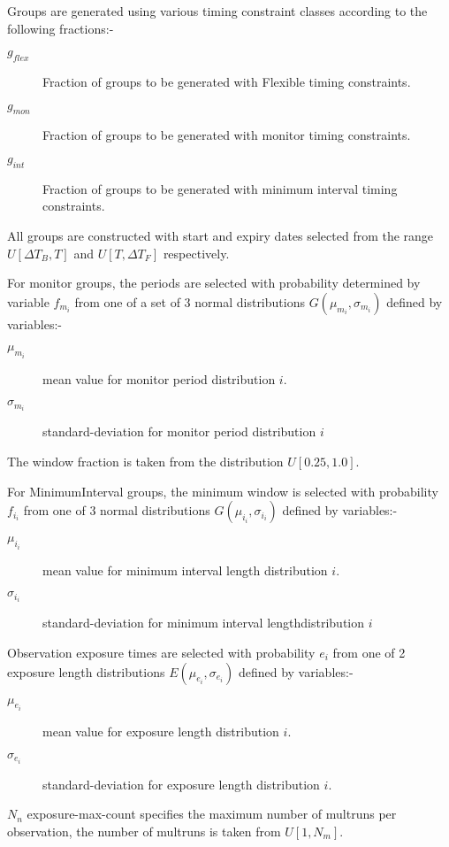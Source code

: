 Groups are generated using various timing constraint classes according to the following fractions:-
\begin{description}
\item [$g_{flex}$] Fraction of groups to be generated with Flexible timing constraints.
\item [$g_{mon}$]  Fraction of groups to be generated with monitor timing constraints.
\item [$g_{int}$]  Fraction of groups to be generated with minimum interval timing constraints.
\end{description}

All groups are constructed with start and expiry dates selected from the range $U[\Delta{T_B}, T]$ and $U[T, \Delta{T_F}]$ respectively. 

For monitor groups, the periods are selected with probability determined by variable $f_{m_i}$ from one of a set of 3 normal distributions $G(\mu_{m_i}, \sigma_{m_i})$ defined by variables:-

\begin{description}
\item [$\mu_{m_i}$]     mean value for monitor period distribution $i$.
\item [$\sigma_{m_i}$]  standard-deviation for monitor period distribution $i$
\end{description}
The window fraction is taken from the distribution $U[0.25, 1.0]$.


For MinimumInterval groups, the minimum window is selected with probability $f_{i_i}$ from one of 3 normal distributions $G(\mu_{i_i}, \sigma_{i_i})$ defined by variables:-

\begin{description}
\item [$\mu_{i_i}$]     mean value for minimum interval length distribution $i$.
\item [$\sigma_{i_i}$]  standard-deviation for minimum interval lengthdistribution $i$
\end{description}


Observation exposure times are selected with probability $e_i$ from one of 2 exposure length distributions $E(\mu_{e_i}, \sigma_{e_i})$ defined by variables:-
\begin{description}
\item [$\mu_{e_i}$]    mean value for exposure length distribution $i$.
\item [$\sigma_{e_i}$] standard-deviation for exposure length distribution $i$.
\end{description}
$N_n$ exposure-max-count specifies the maximum number of multruns per observation, the number of multruns is taken from $U[1,N_m]$. 


